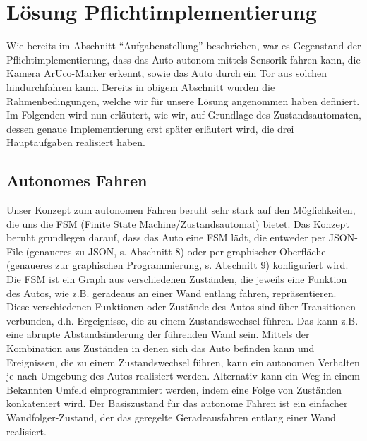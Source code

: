 \section{L\"osung Pflichtimplementierung}
\label{sec:lsgpflicht}

Wie bereits im Abschnitt "`Aufgabenstellung"' beschrieben, war es Gegenstand der Pflichtimplementierung, dass das Auto autonom mittels Sensorik fahren kann, die Kamera ArUco-Marker erkennt, sowie das Auto durch ein Tor aus solchen hindurchfahren kann. Bereits in obigem Abschnitt wurden die Rahmenbedingungen, welche wir für unsere Lösung angenommen haben definiert. Im Folgenden wird nun erläutert, wie wir, auf Grundlage des Zustandsautomaten, dessen genaue Implementierung erst später erläutert wird, die drei Hauptaufgaben realisiert haben.

\subsection{Autonomes Fahren}
Unser Konzept zum autonomen Fahren beruht sehr stark auf den Möglichkeiten, die uns die FSM (Finite State Machine/Zustandsautomat) bietet. 
Das Konzept beruht grundlegen darauf, dass das Auto eine FSM lädt, die entweder per JSON-File (genaueres zu JSON, s. Abschnitt 8) oder per graphischer Oberfläche (genaueres zur graphischen Programmierung, s. Abschnitt 9) konfiguriert wird. Die FSM ist ein Graph aus verschiedenen Zuständen, die jeweils eine Funktion des Autos, wie z.B. geradeaus an einer Wand entlang fahren, repräsentieren. Diese verschiedenen Funktionen oder Zustände des Autos sind über Transitionen verbunden, d.h. Ergeignisse, die zu einem Zustandswechsel führen. Das kann z.B. eine abrupte Abstandsänderung der führenden Wand sein. 
Mittels der Kombination aus Zuständen in denen sich das Auto befinden kann und Ereignissen, die zu einem Zustandswechsel führen, kann ein autonomen Verhalten je nach Umgebung des Autos realisiert werden. Alternativ kann ein Weg in einem Bekannten Umfeld einprogrammiert werden, indem eine Folge von Zuständen konkateniert wird. 
Der Basiszustand für das autonome Fahren ist ein einfacher Wandfolger-Zustand, der das geregelte Geradeausfahren entlang einer Wand realisiert. 

